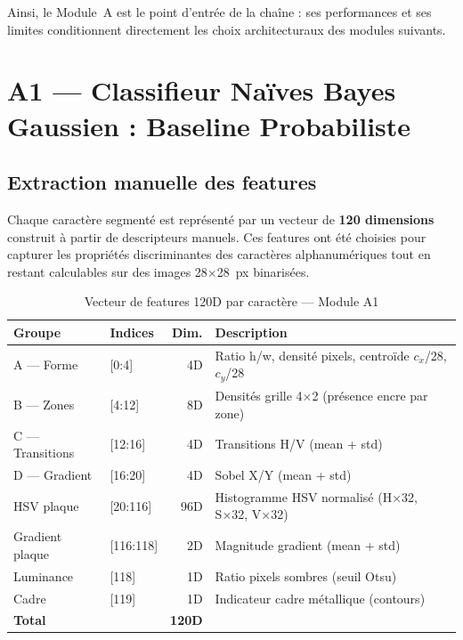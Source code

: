 \medskip
Ainsi, le Module~A est le point d'entrée de la chaîne : ses performances
et ses limites conditionnent directement les choix architecturaux des modules
suivants.

\section{A1 — Classifieur Naïves Bayes Gaussien : Baseline Probabiliste}

\subsection{Extraction manuelle des features}

Chaque caractère segmenté est représenté par un vecteur de \textbf{120
dimensions} construit à partir de descripteurs manuels. Ces features ont
été choisies pour capturer les propriétés discriminantes des caractères
alphanumériques tout en restant calculables sur des images 28×28~px
binarisées.

\begin{table}[H]
  \centering
  \caption{Vecteur de features 120D par caractère — Module A1}
  \label{tab:features_120d}
  \begin{tabular}{llrl}
    \toprule
    Groupe & Indices & Dim. & Description \\
    \midrule
    A — Forme      & [0:4]    & 4D  & Ratio h/w, densité pixels, centroïde $c_x$/28, $c_y$/28 \\
    B — Zones      & [4:12]   & 8D  & Densités grille 4×2 (présence encre par zone) \\
    C — Transitions & [12:16] & 4D  & Transitions H/V (mean + std) \\
    D — Gradient   & [16:20]  & 4D  & Sobel X/Y (mean + std) \\
    HSV plaque     & [20:116] & 96D & Histogramme HSV normalisé (H×32, S×32, V×32) \\
    Gradient plaque & [116:118]& 2D & Magnitude gradient (mean + std) \\
    Luminance      & [118]    & 1D  & Ratio pixels sombres (seuil Otsu) \\
    Cadre          & [119]    & 1D  & Indicateur cadre métallique (contours) \\
    \midrule
    \textbf{Total} & & \textbf{120D} & \\
    \bottomrule
  \end{tabular}
\end{table}

